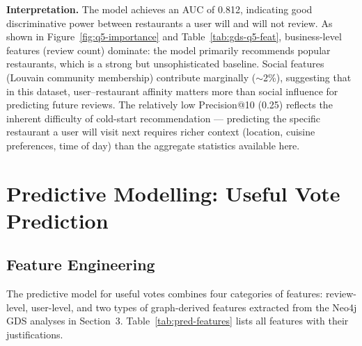 \documentclass[11pt]{article}
\begin{document}
\textbf{Interpretation.} The model achieves an AUC of 0.812, indicating good discriminative power between restaurants a user will and will not review. As shown in Figure~\ref{fig:q5-importance} and Table~\ref{tab:gds-q5-feat}, business-level features (review count) dominate: the model primarily recommends popular restaurants, which is a strong but unsophisticated baseline. Social features (Louvain community membership) contribute marginally ($\sim$2\%), suggesting that in this dataset, user--restaurant affinity matters more than social influence for predicting future reviews. The relatively low Precision@10 (0.25) reflects the inherent difficulty of cold-start recommendation --- predicting the specific restaurant a user will visit next requires richer context (location, cuisine preferences, time of day) than the aggregate statistics available here.

\clearpage
\section{Predictive Modelling: Useful Vote Prediction}

\subsection{Feature Engineering}

The predictive model for useful votes combines four categories of features: review-level, user-level, and two types of graph-derived features extracted from the Neo4j GDS analyses in Section~3. Table~\ref{tab:pred-features} lists all features with their justifications.
\end{document}
